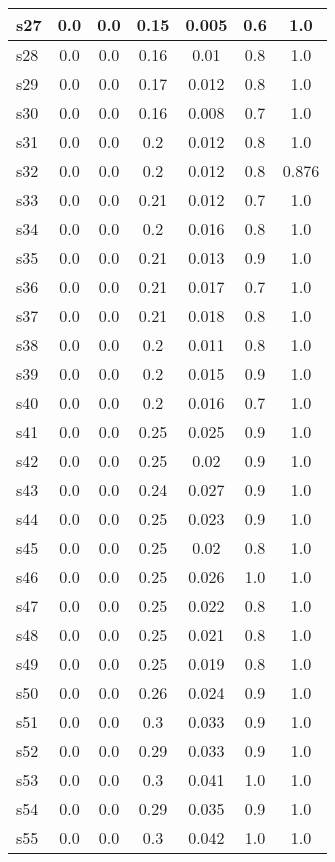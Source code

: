 \documentclass{article}
\begin{document}
\begin{tabular}{|l|c|c|c|c|c|c|}
\hline
s27 &0.0 & 0.0 & 0.15 & 0.005 & 0.6 & 1.0\\
\hline
s28 &0.0 & 0.0 & 0.16 & 0.01 & 0.8 & 1.0\\
\hline
s29 &0.0 & 0.0 & 0.17 & 0.012 & 0.8 & 1.0\\
\hline
s30 &0.0 & 0.0 & 0.16 & 0.008 & 0.7 & 1.0\\
\hline
s31 &0.0 & 0.0 & 0.2 & 0.012 & 0.8 & 1.0\\
\hline
s32 &0.0 & 0.0 & 0.2 & 0.012 & 0.8 & 0.876\\
\hline
s33 &0.0 & 0.0 & 0.21 & 0.012 & 0.7 & 1.0\\
\hline
s34 &0.0 & 0.0 & 0.2 & 0.016 & 0.8 & 1.0\\
\hline
s35 &0.0 & 0.0 & 0.21 & 0.013 & 0.9 & 1.0\\
\hline
s36 &0.0 & 0.0 & 0.21 & 0.017 & 0.7 & 1.0\\
\hline
s37 &0.0 & 0.0 & 0.21 & 0.018 & 0.8 & 1.0\\
\hline
s38 &0.0 & 0.0 & 0.2 & 0.011 & 0.8 & 1.0\\
\hline
s39 &0.0 & 0.0 & 0.2 & 0.015 & 0.9 & 1.0\\
\hline
s40 &0.0 & 0.0 & 0.2 & 0.016 & 0.7 & 1.0\\
\hline
s41 &0.0 & 0.0 & 0.25 & 0.025 & 0.9 & 1.0\\
\hline
s42 &0.0 & 0.0 & 0.25 & 0.02 & 0.9 & 1.0\\
\hline
s43 &0.0 & 0.0 & 0.24 & 0.027 & 0.9 & 1.0\\
\hline
s44 &0.0 & 0.0 & 0.25 & 0.023 & 0.9 & 1.0\\
\hline
s45 &0.0 & 0.0 & 0.25 & 0.02 & 0.8 & 1.0\\
\hline
s46 &0.0 & 0.0 & 0.25 & 0.026 & 1.0 & 1.0\\
\hline
s47 &0.0 & 0.0 & 0.25 & 0.022 & 0.8 & 1.0\\
\hline
s48 &0.0 & 0.0 & 0.25 & 0.021 & 0.8 & 1.0\\
\hline
s49 &0.0 & 0.0 & 0.25 & 0.019 & 0.8 & 1.0\\
\hline
s50 &0.0 & 0.0 & 0.26 & 0.024 & 0.9 & 1.0\\
\hline
s51 &0.0 & 0.0 & 0.3 & 0.033 & 0.9 & 1.0\\
\hline
s52 &0.0 & 0.0 & 0.29 & 0.033 & 0.9 & 1.0\\
\hline
s53 &0.0 & 0.0 & 0.3 & 0.041 & 1.0 & 1.0\\
\hline
s54 &0.0 & 0.0 & 0.29 & 0.035 & 0.9 & 1.0\\
\hline
s55 &0.0 & 0.0 & 0.3 & 0.042 & 1.0 & 1.0\\

\end{tabular}
\end{document}
